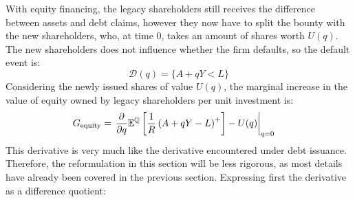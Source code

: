\documentclass[../main.tex]{subfiles}
\begin{document}
        With equity financing, the legacy shareholders still receives the difference between assets and debt claims,
        however they now have to split the bounty with the new shareholders, 
        who, at time 0, takes an amount of shares worth $U(q)$. 
        The new shareholders does not influence whether the firm defaults, so the default event is:
            \begin{equation*}
                \mathcal{D}(q)
                = 
                \{
                    A + qY < L
                \}
            \end{equation*}
        Considering the newly issued shares of value $U(q)$,
        the marginal increase in the value of equity owned by legacy shareholders per unit investment is:
            \begin{align}
                G_{\text{equity}} &=
                    \left.
                    \frac{
                        \partial 
                    }{
                        \partial 
                        q
                    }
                    \mathbb{E}^{\mathbb{Q}}\left[
                        \frac{1}{R} 
                        \left(
                            A + qY - L
                        \right)^{+}
                    \right]
                    -
                    U(q) 
                    \right\rvert_{q=0} 
                    \nonumber
            \end{align}
        This derivative is very much like the derivative encountered under debt issuance.
        Therefore, the reformulation in this section will be less rigorous,
        as most details have already been covered in the previous section.
        Expressing first the derivative as a difference quotient:
\end{document}
